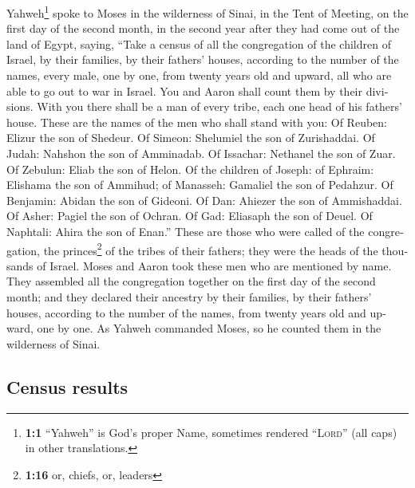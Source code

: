 \begin{paracol}{2}
\begin{otherlanguage}{english}
 Yahweh\footnote{\textbf{1:1} ``Yahweh'' is God's proper
  Name, sometimes rendered ``\textsc{Lord}'' (all caps) in other
  translations.} spoke to Moses in the wilderness of Sinai, in the Tent
of Meeting, on the first day of the second month, in the second year
after they had come out of the land of Egypt, saying, 
``Take a census of all the congregation of the children of Israel, by
their families, by their fathers' houses, according to the number of the
names, every male, one by one,  from twenty years old and
upward, all who are able to go out to war in Israel. You and Aaron shall
count them by their divisions.  With you there shall be a
man of every tribe, each one head of his fathers' house. 
These are the names of the men who shall stand with you: Of Reuben:
Elizur the son of Shedeur.  Of Simeon: Shelumiel the son
of Zurishaddai.  Of Judah: Nahshon the son of Amminadab.
 Of Issachar: Nethanel the son of Zuar.  Of
Zebulun: Eliab the son of Helon.  Of the children of
Joseph: of Ephraim: Elishama the son of Ammihud; of Manasseh: Gamaliel
the son of Pedahzur.  Of Benjamin: Abidan the son of
Gideoni.  Of Dan: Ahiezer the son of Ammishaddai.
 Of Asher: Pagiel the son of Ochran.  Of
Gad: Eliasaph the son of Deuel.  Of Naphtali: Ahira the
son of Enan.''  These are those who were called of the
congregation, the princes\footnote{\textbf{1:16} or, chiefs, or, leaders}
of the tribes of their fathers; they were the heads of the thousands of
Israel.  Moses and Aaron took these men who are mentioned
by name.  They assembled all the congregation together on
the first day of the second month; and they declared their ancestry by
their families, by their fathers' houses, according to the number of the
names, from twenty years old and upward, one by one.  As
Yahweh commanded Moses, so he counted them in the wilderness of Sinai.

\hypertarget{census-results}{%
\subsection{Census results}\label{census-results}}


\end{otherlanguage}
\end{paracol}
